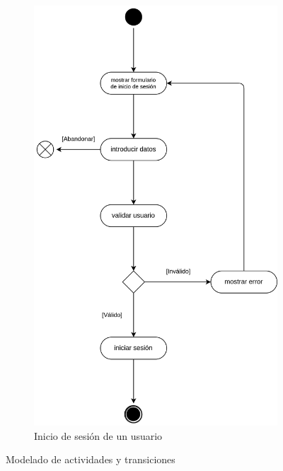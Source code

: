 \begin{figure}[h]
\begin{subfigure}{0.45\textwidth}
                    \centering
                    \includegraphics[scale=0.15]{images/Diagramas/Actividades y transiciones 2.png}
                    \caption{Inicio de sesión de un usuario}
                    \label{fig:inicio-usuario}
                \end{subfigure}

                \caption{Modelado de actividades y transiciones}
                \label{fig:tratamiento-usuarios}
            \end{figure}
            
